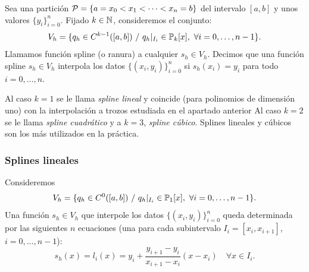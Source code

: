  \begin{definition}
   \label{def:funcion-spline}
   Sea una partición ${\cal P}= \{a = x_0 <x_1 < \cdots <x_n=b\}$ del
   intervalo $[a,b]$ y unos valores $\{y_i\}_{i=0}^n$. Fijado
   $k\in\operatorname{{\mathbb N}}$, consideremos el conjunto:
   \begin{equation*}
     V_h = \{q_h \in C^{k-1}([a,b])\ / \ q_h|_{I_i}\in  \operatorname{{\mathbb P}}_k[x],\ \forall i=0,\dots,n-1\}.
   \end{equation*}
   Llamamos función spline (o ranura) a cualquier $s_h\in V_h$. Decimos que una
   función spline $s_h\in V_h$ interpola los datos $\{(x_i,y_i)\}_{i=0}^n$
   si $s_h(x_i)=y_i$ para todo $i=0,\dots,n$.
 \end{definition}

 Al caso $k=1$ se le llama \textit{spline lineal} y coincide (para
 polinomios de dimensión uno) con la interpolación a trozos estudiada
 en el apartado anterior Al caso $k=2$ se le llama \textit{spline
   cuadrático} y a $k=3$, \textit{spline cúbico}. Splines lineales y
 cúbicos son los más utilizados en la práctica.

 \subsubsection{Splines lineales}
 \label{sec:splines-lineales}

 Consideremos
 \begin{equation*}
   V_h = \{q_h \in C^{0}([a,b])\ / \ q_h|_{I_i}\in  \operatorname{{\mathbb P}}_1[x],\ \forall i=0,\dots,n-1\}.
 \end{equation*}
 Una función $s_h\in V_h$ que interpole los datos
 $\{(x_i,y_i)\}_{i=0}^n$ queda determinada por las siguientes $n$
 ecuaciones (una para cada subintervalo $I_i=[x_i, x_{i+1}]$,
 $i=0,\dots,n-1$):
 \begin{equation*}
   \label{eq:splines-lineales-1}
   s_h(x) = l_i(x) = y_i + \frac{y_{i+1}-y_i}{x_{i+1}-x_i}(x-x_i) \quad
   \forall x\in I_i.
 \end{equation*}

